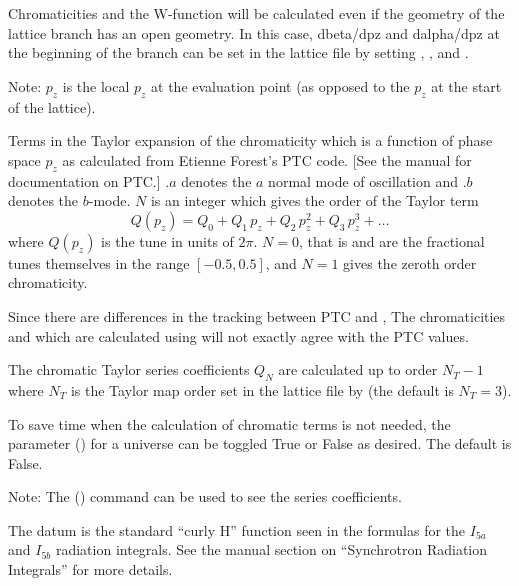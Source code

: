\begin{description}
{{{{{Chromaticities and the W-function will be calculated even if the geometry of the lattice branch has
an open geometry.  In this case, dbeta/dpz and dalpha/dpz at the beginning of the branch can be set
in the lattice file by setting , ,
 and .

Note: $p_z$ is the local $p_z$ at the evaluation point (as opposed to the $p_z$ at the start of the lattice).

  \item[chrom_ptc.a.$N$, chrom_ptc.b.$N$, $N = 0, 1, 2, \ldots$] \Newline {}
Terms in the Taylor expansion of the chromaticity which is a function of phase space $p_z$ as
calculated from Etienne Forest's PTC code. [See the \bmad manual for documentation on PTC.] $.a$
denotes the $a$ normal mode of oscillation and $.b$ denotes the $b$-mode. $N$ is an integer which
gives the order of the Taylor term
\begin{equation}
  Q(p_z) = Q_0 + Q_1 \, p_z + Q_2 \, p_z^2 + Q_3 \, p_z^3 + \ldots
\end{equation}
where $Q(p_z)$ is the tune in units of $2\pi$.  $N = 0$, that is  and
 are the fractional tunes themselves in the range $[-0.5, 0.5]$, and $N = 1$ gives
the zeroth order chromaticity.

Since there are differences in the tracking between PTC and \bmad, The chromaticities  and
 which are calculated using \bmad will not exactly agree with the PTC values.

The chromatic Taylor series coefficients $Q_N$ are calculated up to order $N_T-1$ where $N_T$ is the
Taylor map order set in the lattice file by  (the default is $N_T=3$). 

To save time when the calculation of chromatic terms is not needed, the  parameter
() for a universe can be toggled True or False as desired. The default is False.

Note: The  () command can be used to see the series coefficients.

  \item[curly_h.a, .b] \Newline {}
The  datum is the standard ``curly H'' function seen in the formulas for the $I_{5a}$
and $I_{5b}$ radiation integrals. See the \bmad manual section on ``Synchrotron Radiation Integrals''
for more details.

}}}}}
\end{description}
